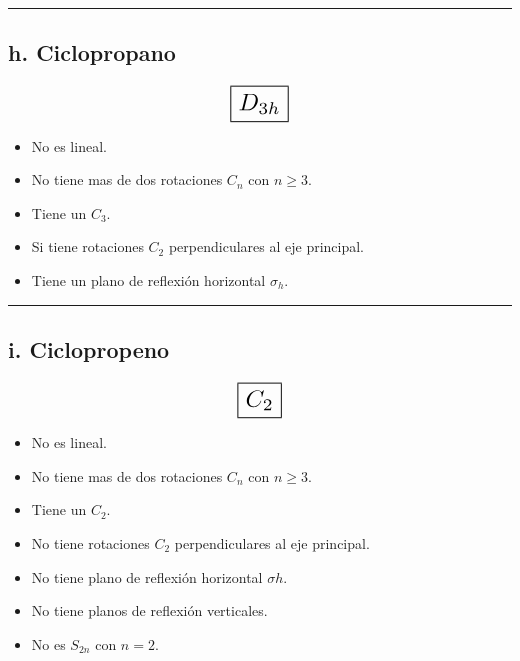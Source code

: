 \iffalse
No es lineal.
No tiene ejes de rotación $C_n$ con $n \geq 3$.
Tiene un $C_2$ sobre el eje que sale del plano.
No tiene $C_2$ perpendiculares al eje principal.
Tiene un plano de reflexion horizontal $\sigma_h$.

C_2h
\fi

\begin{center}
    \rule{15cm}{0.4pt}
\end{center}


\subsection*{h. Ciclopropano}

\[ \scalebox{1.7}{$\boxed{D_{3h}}$} \]

\begin{itemize}
    \item No es lineal.
    \item No tiene mas de dos rotaciones $C_n$ con $n \geq 3$.
    \item Tiene un $C_3$.
    \item Si tiene rotaciones $C_2$ perpendiculares al eje principal.
    \item Tiene un plano de reflexión horizontal $\sigma_h$.
\end{itemize}

\iffalse
No es lineal.
No tiene mas de dos rotaciones $C_n$ con $n \geq 3$.
Tiene un $C_3$.
Si tiene rotaciones $C_2$ perpendiculares al eje principal.
Tiene un plano de reflexión horizontal $\sigma_h$.

D_3h
\fi

\begin{center}
    \rule{15cm}{0.4pt}
\end{center}


\subsection*{i. Ciclopropeno}

\[ \scalebox{1.7}{$\boxed{C_2}$} \]

\begin{itemize}
    \item No es lineal.
    \item No tiene mas de dos rotaciones $C_n$ con $n \geq 3$.
    \item Tiene un $C_2$.
    \item No tiene rotaciones $C_2$ perpendiculares al eje principal.
    \item No tiene plano de reflexión horizontal $\sigma h$.
    \item No tiene planos de reflexión verticales.
    \item No es $S_{2n}$ con $n=2$.
\end{itemize}

